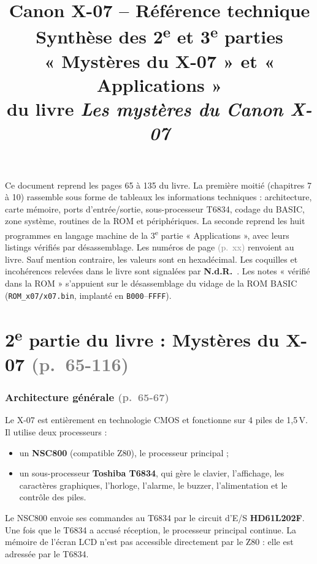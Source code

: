 \documentclass[a4paper,10pt]{article}
\title{\textbf{Canon X-07 -- Référence technique}\\[4pt]
\large Synthèse des 2\textsuperscript{e} et 3\textsuperscript{e} parties\\
« Mystères du X-07 » et « Applications »\\
du livre \emph{Les mystères du Canon X-07}}
\author{}
\date{}
\newcommand{\hex}[1]{\texttt{#1}}
\newcommand{\pg}[1]{\texorpdfstring{\textcolor{gray}{\small(p.~#1)}}{}}
\newcommand{\nota}[1]{\textcolor{red!60!black}{\small\textbf{N.d.R.}~#1}}
\begin{document}
\maketitle

\begin{center}
\begin{minipage}{0.85\textwidth}\small
Ce document reprend les pages 65 à 135 du livre. La première moitié (chapitres 7
à 10) rassemble sous forme de tableaux les informations techniques :
architecture, carte mémoire, ports d'entrée/sortie, sous-processeur T6834,
codage du BASIC, zone système, routines de la ROM et périphériques. La
seconde reprend les huit programmes en langage machine de la
3\textsuperscript{e} partie « Applications », avec leurs listings vérifiés
par désassemblage. Les numéros de page \pg{xx} renvoient au livre. Sauf mention
contraire, les valeurs sont en hexadécimal. Les coquilles et incohérences
relevées dans le livre sont signalées par \nota{}. Les notes « vérifié dans
la ROM » s'appuient sur le désassemblage du vidage de la ROM BASIC
(\texttt{ROM\_x07/x07.bin}, implanté en \hex{B000}--\hex{FFFF}).
\end{minipage}
\end{center}

\tableofcontents
\newpage

\part*{2\textsuperscript{e} partie du livre : Mystères du X-07 \pg{65-116}}

\section{Architecture générale \pg{65-67}}

Le X-07 est entièrement en technologie CMOS et fonctionne sur 4 piles de 1,5\,V.
Il utilise deux processeurs :
\begin{itemize}
  \item un \textbf{NSC800} (compatible Z80), le processeur principal ;
  \item un sous-processeur \textbf{Toshiba T6834}, qui gère le clavier,
        l'affichage, les caractères graphiques, l'horloge, l'alarme, le buzzer,
        l'alimentation et le contrôle des piles.
\end{itemize}
Le NSC800 envoie ses commandes au T6834 par le circuit d'E/S \textbf{HD61L202F}.
Une fois que le T6834 a accusé réception, le processeur principal continue.
La mémoire de l'écran LCD n'est pas accessible directement par le Z80 : elle
est adressée par le T6834.
\end{document}
